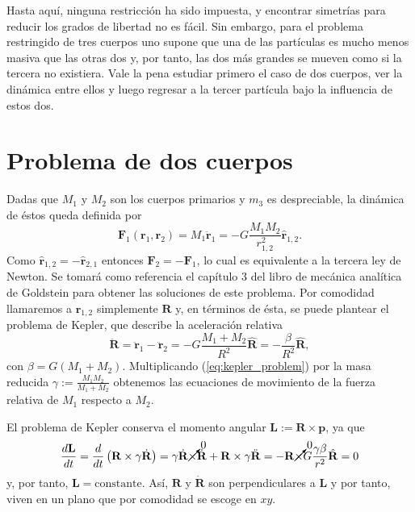 Hasta aquí, ninguna restricción ha sido impuesta, y encontrar simetrías para reducir los grados de libertad no es fácil. Sin embargo, para el problema restringido de tres cuerpos uno supone que una de las partículas es mucho menos masiva que las otras dos y, por tanto, las dos más grandes se mueven como si la tercera no existiera. Vale la pena estudiar primero el caso de dos cuerpos, ver la dinámica entre ellos y luego regresar a la tercer partícula bajo la influencia de estos dos. 

\section{Problema de dos cuerpos}
\label{sec:2body_problem}
Dadas que $M_1$ y $M_2$ son los cuerpos primarios y $m_3$ es despreciable, la dinámica de éstos queda definida por
\begin{equation}
 \mathbf{F}_1(\mathbf{r}_1,\mathbf{r}_2) = M_1 \ddot{\mathbf{r}}_1 = -G \frac{M_1 M_2}{r_{1,2}^2} \hat{\mathbf{r}}_{1,2}.
 \label{eq:2body_eqs_motion}
\end{equation}
Como $\hat{\mathbf{r}}_{1,2} = - \hat{\mathbf{r}}_{2,1}$ entonces $\mathbf{F}_2 = -\mathbf{F}_1$, lo cual es equivalente a la tercera ley de Newton. Se tomará como referencia el capítulo 3 del libro de mecánica analítica de Goldstein \cite{Goldstein2007} para obtener las soluciones de este problema. Por comodidad llamaremos a $\mathbf{r}_{1,2}$ simplemente $\mathbf{R}$ y, en términos de ésta, se puede plantear el problema de Kepler, que describe la aceleración relativa
\begin{equation}
 \ddot{\mathbf{R}} = \ddot{\mathbf{r}}_1 - \ddot{\mathbf{r}}_2 = -G \frac{M_1 + M_2}{R^2} \hat{\mathbf{R}} = - \frac{\beta}{R^2}\hat{\mathbf{R}},
 \label{eq:kepler_problem}
\end{equation}
con $\beta = G \left(M_1 + M_2 \right)$. Multiplicando (\ref{eq:kepler_problem}) por la masa reducida $\gamma := \frac{M_1 M_2}{M_1+M_2}$ obtenemos las ecuaciones de movimiento de la fuerza relativa de $M_1$ respecto a $M_2$.

El problema de Kepler conserva el momento angular $\mathbf{L} := \mathbf{R} \times \mathbf{p}$, ya que
\begin{equation}
 \frac{d\mathbf{L}}{dt} = \frac{d}{dt}\left(\mathbf{R} \times \gamma\dot{\mathbf{R}} \right) = \gamma\dot{\mathbf{R}} \cancelto{0}{\times}\dot{\mathbf{R}} + \mathbf{R} \times \gamma \ddot{\mathbf{R}} = - \mathbf{R} \cancelto{0}{\times} G\frac{\gamma \beta}{r^2}\hat{\mathbf{R}} = 0
\end{equation}
y, por tanto, $\mathbf{L} = \text{constante}$. Así, $\mathbf{R}$ y $\dot{\mathbf{R}}$ son perpendiculares a $\mathbf{L}$ y por tanto, viven en un plano que por comodidad se escoge en $xy$. 

